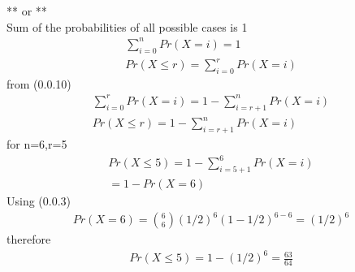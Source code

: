 \documentclass[journal,12pt,twocolumn]{IEEEtran}
\begin{document}
\begin{enumerate}
        **     or **\\
       Sum of the probabilities of all possible cases is 1\\
    \begin{align}
        \sum^{n}_{i=0}Pr(X=i)=1\\
        Pr(X\leq r)=\sum^{r}_{i=0}Pr(X=i)
    \end{align}
        from (0.0.10)\\
    \begin{align}
        \sum^{r}_{i=0}Pr(X=i)=1-\sum^{n}_{i=r+1}Pr(X=i)\\
        Pr(X\leq r)=1-\sum^{n}_{i=r+1}Pr(X=i)
    \end{align}
    for n=6,r=5
    \begin{align}
        Pr(X\leq5)=1-\sum^{6}_{i=5+1}Pr(X=i)\\
        =1-Pr(X=6)
    \end{align}
    Using (0.0.3)
    \begin{align}
       Pr(X=6)=\binom{6}{6} (1/2)^{6}(1-1/2)^{6-6}=(1/2)^6
    \end{align}
    therefore
    \begin{align}
      Pr(X\leq5)=1-(1/2)^6=\frac{63}{64}
    \end{align}
\end{enumerate}
\end{document}
